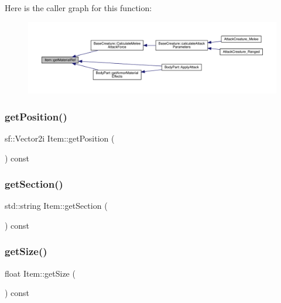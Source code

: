 Here is the caller graph for this function\+:
\nopagebreak
\begin{figure}[H]
\begin{center}
\leavevmode
\includegraphics[width=350pt]{class_item_af22ec5d207b70e2a3359e76dccfc7e11_icgraph}
\end{center}
\end{figure}
\mbox{\label{class_item_ab015078a1ea19c197fc88b7a556d37cc}} 
\subsubsection{\texorpdfstring{get\+Position()}{getPosition()}}
{\footnotesize\ttfamily sf\+::\+Vector2i Item\+::get\+Position (\begin{DoxyParamCaption}{ }\end{DoxyParamCaption}) const}

\mbox{\label{class_item_abe4ed40d2027ca131b669d471b47f29f}} 
\subsubsection{\texorpdfstring{get\+Section()}{getSection()}}
{\footnotesize\ttfamily std\+::string Item\+::get\+Section (\begin{DoxyParamCaption}{ }\end{DoxyParamCaption}) const}

\mbox{\label{class_item_a2a84b0b0b25d4d1e8bb1b456d8094b84}} 
\subsubsection{\texorpdfstring{get\+Size()}{getSize()}}
{\footnotesize\ttfamily float Item\+::get\+Size (\begin{DoxyParamCaption}{ }\end{DoxyParamCaption}) const}

